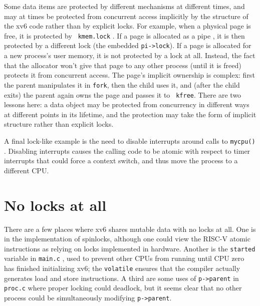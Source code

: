 Some data items are protected by different mechanisms at different
times, and may at times be protected from concurrent access implicitly
by the structure of the xv6 code rather than by explicit locks. For
example, when a physical page is free, it is protected by {\tt
  kmem.lock} . If a page is
allocated as a pipe , it is then
protected by a different lock (the embedded {\tt pi->lock}). If a page
is allocated for a new process's user memory, it is not protected by a
lock at all. Instead, the fact that the allocator won't give that page
to any other process (until it is freed) protects it from concurrent
access. The page's implicit ownership is complex: first the parent
manipulates it in {\tt fork}, then the child uses it, and (after the
child exits) the parent again owns the page and passes it to {\tt
  kfree}. There are two lessons here: a data object may be protected
from concurrency in different ways at different points in its
lifetime, and the protection may take the form of implicit structure
rather than explicit locks.

A final lock-like example is the need to disable interrupts around
calls to {\tt mycpu()} . Disabling
interrupts causes the calling code to be atomic with respect to timer
interrupts that could force a context switch, and thus move the
process to a different CPU.

\section{No locks at all}

There are a few places where xv6 shares mutable data with no locks at
all. One is in the implementation of spinlocks, although one could
view the RISC-V atomic instructions as relying on locks implemented in
hardware. Another is the {\tt started} variable in {\tt main.c}
, used to prevent other CPUs from
running until CPU zero has finished initializing xv6;
the {\tt volatile} ensures that the compiler actually generates
load and store instructions.
A third are some uses of {\tt p->parent} in {\tt proc.c}
 
where proper locking could deadlock, but it seems clear that
no other process could be simultaneously modifying {\tt p->parent}.

